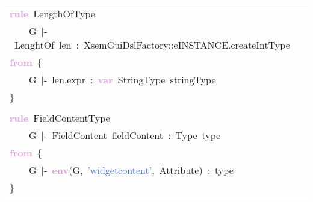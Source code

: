 \begin{tabular}[t]{l}
\noindent
\mbox{}\textbf{\textcolor{Plum}{rule}}\ LengthOfType \\
\mbox{}\ \ \ \ G\ $|$-\ LenghtOf\ len\ :\ XsemGuiDslFactory::eINSTANCE.createIntType \\
\mbox{}\textbf{\textcolor{Plum}{from}}\ \{ \\
\mbox{}\ \ \ \ G\ $|$-\ len.expr\ :\ \textbf{\textcolor{Plum}{var}}\ StringType\ stringType \\
\mbox{}\} \\
\mbox{} \\
\mbox{}\textbf{\textcolor{Plum}{rule}}\ FieldContentType \\
\mbox{}\ \ \ \ G\ $|$-\ FieldContent\ fieldContent\ :\ Type\ type \\
\mbox{}\textbf{\textcolor{Plum}{from}}\ \{ \\
\mbox{}\ \ \ \ G\ $|$-\ \textbf{\textcolor{Plum}{env}}(G,\ \textcolor{RoyalBlue}{'widgetcontent'},\ Attribute)\ :\ type \\
\mbox{}\}
\end{tabular}
